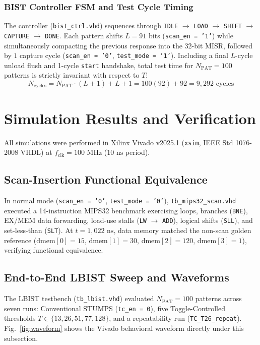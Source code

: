 \documentclass[conference]{IEEEtran}
\begin{document}
\subsubsection{BIST Controller FSM and Test Cycle Timing}
The controller (\texttt{bist\_ctrl.vhd}) sequences through \texttt{IDLE} $\rightarrow$ \texttt{LOAD} $\rightarrow$ \texttt{SHIFT} $\rightarrow$ \texttt{CAPTURE} $\rightarrow$ \texttt{DONE}. Each pattern shifts $L = 91$ bits (\texttt{scan\_en = '1'}) while simultaneously compacting the previous response into the 32-bit MISR, followed by $1$ capture cycle (\texttt{scan\_en = '0'}, \texttt{test\_mode = '1'}). Including a final $L$-cycle unload flush and 1-cycle \texttt{start} handshake, total test time for $N_{\text{PAT}} = 100$ patterns is strictly invariant with respect to $T$:
\begin{equation}
    N_{\text{cycles}} = N_{\text{PAT}} \cdot (L + 1) + L + 1 = 100(92) + 92 = 9,292\text{ cycles}
    \label{eq:cycles}
\end{equation}

\section{Simulation Results and Verification}

All simulations were performed in Xilinx Vivado v2025.1 (\texttt{xsim}, IEEE Std 1076-2008 VHDL) at $f_{\text{clk}} = 100\text{ MHz}$ ($10\text{ ns}$ period).

\subsection{Scan-Insertion Functional Equivalence}
In normal mode (\texttt{scan\_en = '0'}, \texttt{test\_mode = '0'}), \texttt{tb\_mips32\_scan.vhd} executed a 14-instruction MIPS32 benchmark exercising loops, branches (\texttt{BNE}), EX/MEM data forwarding, load-use stalls (\texttt{LW} $\rightarrow$ \texttt{ADD}), logical shifts (\texttt{SLL}), and set-less-than (\texttt{SLT}). At $t = 1,022\text{ ns}$, data memory matched the non-scan golden reference ($\text{dmem}[0]=15$, $\text{dmem}[1]=30$, $\text{dmem}[2]=120$, $\text{dmem}[3]=1$), verifying functional equivalence.

\subsection{End-to-End LBIST Sweep and Waveforms}
The LBIST testbench (\texttt{tb\_lbist.vhd}) evaluated $N_{\text{PAT}} = 100$ patterns across seven runs: Conventional STUMPS (\texttt{tc\_en = 0}), five Toggle-Controlled thresholds $T \in \{13, 26, 51, 77, 128\}$, and a repeatability run (\texttt{TC\_T26\_repeat}). Fig.~\ref{fig:waveform} shows the Vivado behavioral waveform directly under this subsection.
\end{document}
